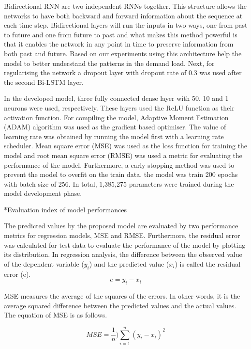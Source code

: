\documentclass[twocolumn, a4paper,10pt]{article}
\makeatletter
\renewcommand\subsubsection{\@startsection{subsection}{1}{\z@}{0.2cm}{0.1cm}{\normalfont\normalsize\itshape}}
\makeatother
\begin{document}
Bidirectional RNN are two independent RNNs together. This structure allows the networks to have both backward and forward information about the sequence at each time step. Bidirectional layers will run the inputs in two ways, one from past to future and one from future to past and what makes this method powerful is that it enables the network in any point in time to preserve information from both past and future. Based on our experiments using this architecture help the model to better understand the patterns in the demand load. Next, for regularising the network a dropout layer with dropout rate of 0.3 was used after the second Bi-LSTM layer.

 In the developed model, three fully connected dense layer with 50, 10 and 1 neurons were used, respectively. These layers used the ReLU function as their activation function.  For compiling the model, Adaptive Moment Estimation (ADAM) \citep{RN1292} algorithm was used as the gradient based optimiser. The value of learning rate was obtained by running the model first with a learning rate scheduler.
Mean square error (MSE) was used as the loss function for training the model and root mean square error (RMSE) was used a metric for evaluating the performance of the model. Furthermore, a early stopping method was used to prevent the model to overfit on the train data. the model was train 200 epochs with batch size of 256. In total, 1,385,275 parameters were trained during the model development phase.

\subsubsection*{Evaluation index of model performances}

The predicted values by the proposed model are evaluated by two performance metrics for regression models, MSE and RMSE. Furthermore, the residual error was calculated for test data to evaluate the performance of the model by plotting its distribution. In regression analysis, the difference between the observed value of the dependent variable ($y_{i}$) and the predicted value ($x_{i}$) is called the residual error (e).
$$ e = y_{i} - x_{i} $$

MSE  measures the average of the squares of the errors. In other words, it is the average squared difference between the predicted values and the actual values. The equation of MSE is as follows.

$$ MSE = \frac{1}{n})\sum_{i=1}^{n}(y_{i} - x_{i})^{2} $$
\end{document}
